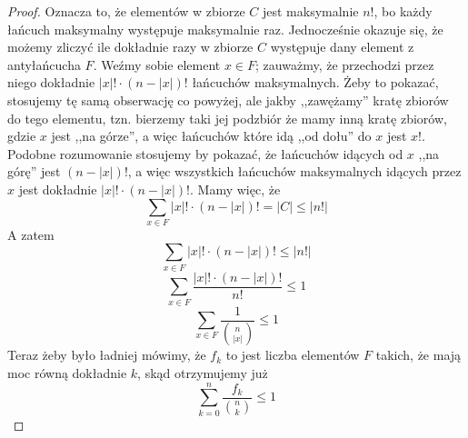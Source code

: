 \begin{proof}
	Oznacza to, że elementów w zbiorze $C$ jest maksymalnie $n!$, bo każdy łańcuch maksymalny występuje maksymalnie raz. Jednocześnie okazuje się, że możemy zliczyć ile dokładnie razy w zbiorze $C$ występuje dany element z antyłańcucha $F$. Weźmy sobie element $x \in F$; zauważmy, że przechodzi przez niego dokładnie $|x|! \cdot (n - |x|)!$ łańcuchów maksymalnych. Żeby to pokazać, stosujemy tę samą obserwację co powyżej, ale jakby ,,zawężamy'' kratę zbiorów do tego elementu, tzn. bierzemy taki jej podzbiór że mamy inną kratę zbiorów, gdzie $x$ jest ,,na górze'', a więc łańcuchów które idą ,,od dołu'' do $x$ jest $x!$. Podobne rozumowanie stosujemy by pokazać, że łańcuchów idących od $x$ ,,na górę'' jest $(n - |x|)!$, a więc wszystkich łańcuchów maksymalnych idących przez $x$ jest dokładnie $|x|! \cdot (n - |x|)!$.
	Mamy więc, że
	\begin{equation*}
		\sum_{x \in F} |x|! \cdot (n - |x|)! = |C| \leq |n!|
	\end{equation*}
	A zatem
	\begin{equation*}
		\sum_{x \in F} |x|! \cdot (n - |x|)! \leq |n!|
	\end{equation*}
	\begin{equation*}
		\sum_{x \in F} \frac{|x|! \cdot (n - |x|)!}{n!} \leq 1
	\end{equation*}
	\begin{equation*}
		\sum_{x \in F} \frac{1}{\binom{n}{|x|}} \leq 1
	\end{equation*}
	Teraz żeby było ładniej mówimy, że $f_k$ to jest liczba elementów $F$ takich, że mają moc równą dokładnie $k$, skąd otrzymujemy już
	\begin{equation*}
		\sum_{k=0}^{n} \frac{f_k}{\binom{n}{k}} \leq 1
	\end{equation*}
\end{proof}
